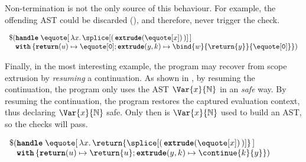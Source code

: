 Non-termination is not the only source of this behaviour. For example, the offending AST could be discarded (), and therefore, never trigger the check.

\begin{code} 
 \begin{source}
  $\begin{array}{l}
      \$(\textbf{\texttt{handle}} \; \equote[\,{\lambda x. \,\splice[(\,{{\textbf{\texttt{extrude}}(\equote[x])}}\,)]}\,] \\
      \;\;\,\, \textbf{\texttt{with}} \, \{ \textbf{\texttt{return}}(u) \mapsto {\equote[\texttt{0}]}; \textbf{\texttt{extrude}}(y, k) \mapsto {\bind{w}{\return{y}}{\equote[\texttt{0}]}}\})
    \end{array}$
 \end{source}
 \label{listing:eager-scope-extrusion-unsafe-no-use}
\end{code}

Finally, in the most interesting example, the program may recover from scope extrusion by \textit{resuming} a continuation. As shown in , by resuming the continuation, the program only uses the AST $\Var{x}{\mathbb{N}}$ in an \textit{safe} way. By resuming the continuation, the program restores the captured evaluation context, thus declaring $\Var{x}{\mathbb{N}}$ safe. Only then is $\Var{x}{\mathbb{N}}$ used to build an AST, so the checks will pass.

\begin{code} 
 \begin{source}
  $\begin{array}{l}
      \$ (\textbf{\texttt{handle}} \; \equote[\, {\lambda x. \,\return{\splice[( \, {{\textbf{\texttt{extrude}}(\equote[x])}} \,)]}} \,] \\
      \;\;\,\, \textbf{\texttt{with}} \, \{ \textbf{\texttt{return}}(u) \mapsto {\return{u}}; \textbf{\texttt{extrude}}(y, k) \mapsto {{\continue{k}{y}}}\})
    \end{array}$
 \end{source}
 \label{listing:eager-scope-extrusion-unsafe-continue}
\end{code}

